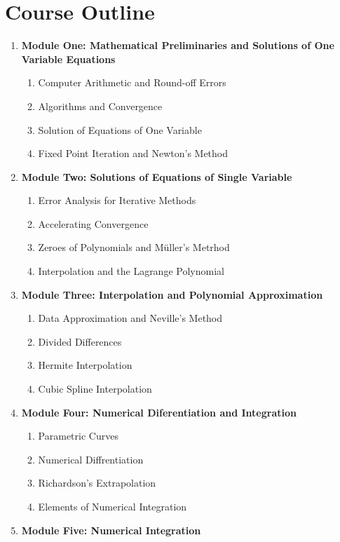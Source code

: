 \section*{Course Outline}
\begin{enumerate}[label=\arabic*.]
\item {\bf Module One: Mathematical Preliminaries and Solutions of One Variable Equations}
\begin{enumerate}[label=(\roman*)]
\item Computer Arithmetic and Round-off Errors
\item Algorithms and Convergence
\item Solution of Equations of One Variable
\item Fixed Point Iteration and Newton’s Method
\end{enumerate}
\item {\bf Module Two: Solutions of Equations of Single Variable}
\begin{enumerate}[label=(\roman*)]
\item Error Analysis for Iterative Methods
\item Accelerating Convergence
\item Zeroes of Polynomials and Müller’s Metrhod
\item Interpolation and the Lagrange Polynomial
\end{enumerate}
\item {\bf Module Three: Interpolation and Polynomial Approximation}
\begin{enumerate}[label=(\roman*)]
\item Data Approximation and Neville’s Method
\item Divided Differences
\item Hermite Interpolation
\item Cubic Spline Interpolation
\end{enumerate}
\item {\bf Module Four: Numerical Diferentiation and Integration}
\begin{enumerate}[label=(\roman*)]
\item Parametric Curves
\item Numerical Diffrentiation
\item Richardson’s Extrapolation
\item Elements of Numerical Integration
\end{enumerate}
\item {\bf Module Five: Numerical Integration}
\begin{enumerate}[label=(\roman*)]

\end{enumerate}
\end{enumerate}

